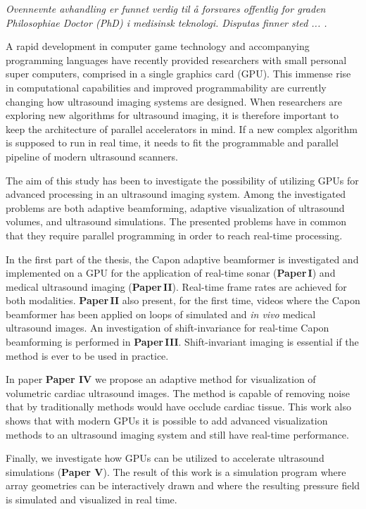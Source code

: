 \documentclass[10pt,b5paper,twoside]{book}
\begin{document}
\vspace{0.2cm}
\noindent \emph{Ovennevnte avhandling er funnet verdig til \aa{} forsvares offentlig for graden Philosophiae Doctor (PhD) i medisinsk teknologi. Disputas finner sted ... .}

A rapid development in computer game technology and accompanying programming languages have recently provided researchers with small personal super computers, comprised in a single graphics card (GPU). This immense rise in computational capabilities and improved programmability are currently changing how ultrasound imaging systems are designed. When researchers are exploring new algorithms for ultrasound imaging, it is therefore important to keep the architecture of parallel accelerators in mind. If a new complex algorithm is supposed to run in real time, it needs to fit the programmable and parallel pipeline of modern ultrasound scanners.

The aim of this study has been to investigate the possibility of utilizing GPUs for advanced processing in an ultrasound imaging system. Among the investigated problems are both adaptive beamforming, adaptive visualization of ultrasound volumes, and ultrasound simulations. The presented problems have in common that they require parallel programming in order to reach real-time processing. 

In the first part of the thesis, the Capon adaptive beamformer is investigated and implemented on a GPU for the application of real-time sonar (\textbf{Paper\,I}) and medical ultrasound imaging (\textbf{Paper\,II}). Real-time frame rates are achieved for both modalities. \textbf{Paper\,II} also present, for the first time, videos where the Capon beamformer has been applied on loops of simulated and \textit{in vivo} medical ultrasound images. An investigation of shift-invariance for real-time Capon beamforming is performed in \textbf{Paper\,III}. Shift-invariant imaging is essential if the method is ever to be used in practice.

In paper \textbf{Paper IV} we propose an adaptive method for visualization of volumetric cardiac ultrasound images. The method is capable of removing noise that by traditionally methods would have occlude cardiac tissue. This work also shows that with modern GPUs it is possible to add advanced visualization methods to an ultrasound imaging system and still have real-time performance.

Finally, we investigate how GPUs can be utilized to accelerate ultrasound simulations (\textbf{Paper V}). The result of this work is a simulation program where array geometries can be interactively drawn and where the resulting pressure field is simulated and visualized in real time.
\end{document}
